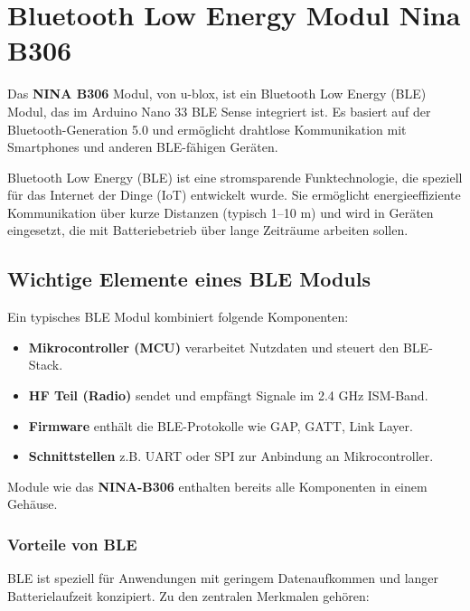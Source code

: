 %
%

\chapter{Bluetooth Low Energy Modul Nina B306}

Das \textbf{NINA B306} Modul, von u-blox, ist ein Bluetooth Low Energy (BLE) Modul, das im Arduino Nano 33 BLE Sense integriert ist. Es basiert auf der Bluetooth-Generation 5.0 und ermöglicht drahtlose Kommunikation mit Smartphones und anderen BLE-fähigen Geräten. \cite{ublox:2017}

Bluetooth Low Energy (BLE) ist eine stromsparende Funktechnologie, die speziell für das Internet der Dinge (IoT) entwickelt wurde. Sie ermöglicht energieeffiziente Kommunikation über kurze Distanzen (typisch 1–10 m) und wird in Geräten eingesetzt, die mit Batteriebetrieb über lange Zeiträume arbeiten sollen. \cite{Kumar.2023}

\section{Wichtige Elemente eines BLE Moduls}
Ein typisches BLE Modul kombiniert folgende Komponenten:

\begin{itemize}
	\item \textbf{Mikrocontroller (MCU)} verarbeitet Nutzdaten und steuert den BLE-Stack.
	\item \textbf{HF Teil (Radio)} sendet und empfängt Signale im 2.4 GHz ISM-Band.
	\item \textbf{Firmware} enthält die BLE-Protokolle wie GAP, GATT, Link Layer.
	\item \textbf{Schnittstellen} z.B. UART oder SPI zur Anbindung an Mikrocontroller.
\end{itemize}
\cite{Morais.2023}

Module wie das \textbf{NINA-B306} enthalten bereits alle Komponenten in einem Gehäuse. \cite{ublox:2017}

	\subsection{Vorteile von BLE}
	BLE ist speziell für Anwendungen mit geringem Datenaufkommen und langer Batterielaufzeit konzipiert. Zu den zentralen Merkmalen gehören:
	
